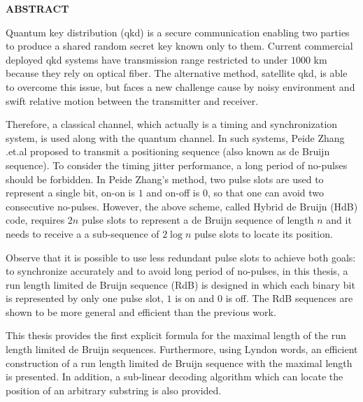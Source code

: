 \begin{center}
    \Large{\textbf{ABSTRACT}}\\
\end{center}
\vspace{1cm}

Quantum key distribution (\gls{qkd}) is a secure communication enabling two parties to produce a shared random secret key known only to them. Current commercial deployed \gls{qkd} systems have transmission range restricted to under $1000$ km because they rely on optical fiber. The alternative method, satellite \gls{qkd}, is able to overcome this issue, but faces a new challenge cause by noisy environment and swift relative motion between the transmitter and receiver. 

Therefore, a classical channel, which actually is a timing and synchronization system, is used along with the quantum channel. In such systems, Peide Zhang .et.al proposed to transmit a positioning sequence (also known as de Bruijn sequence). To consider the timing jitter performance, a long period of no-pulses should be forbidden. In Peide Zhang's method, two pulse slots are used to represent a single bit, on-on is $1$ and on-off is $0$, so that one can avoid two consecutive no-pulses. However, the above scheme, called Hybrid de Bruijn (\gls{HdB}) code, requires $2n$ pulse slots to represent a de Bruijn sequence of length $n$ and it needs to receive a a sub-sequence of $2 \log n$ pulse slots to locate its position. 

Observe that it is possible to use less redundant pulse slots to achieve both goals: to synchronize accurately and to avoid long period of no-pulses, in this thesis,  a run length limited de Bruijn sequence (\gls{RdB}) is designed in which each binary bit is represented by only one pulse slot, $1$ is on and $0$ is off. The \gls{RdB} sequences are shown to be more general and efficient than the previous work. 

This thesis provides the first explicit formula for the maximal length of the run length limited de Bruijn sequences. Furthermore, using Lyndon words, an efficient construction of a run length limited de Bruijn sequence with the maximal length is presented. In addition, a sub-linear decoding algorithm which can locate the position of an arbitrary substring is also provided. 

